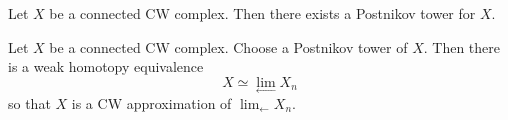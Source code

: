 \documentclass[a4paper]{article}
\begin{document}
\begin{prp}{}{} Let $X$ be a connected CW complex. Then there exists a Postnikov tower for $X$. 
\end{prp}

\begin{prp}{}{} Let $X$ be a connected CW complex. Choose a Postnikov tower of $X$. Then there is a weak homotopy equivalence $$X\simeq\lim_{\leftarrow}X_n$$ so that $X$ is a CW approximation of $\lim_{\leftarrow}X_n$. 
\end{prp}
\end{document}
